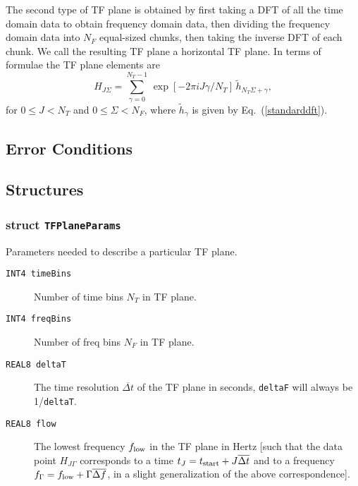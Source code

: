 The second type of TF plane is obtained by first taking a DFT of all the time
domain data to obtain frequency domain data, then dividing the frequency
domain data into $N_F$ equal-sized chunks, then taking the inverse DFT of each
chunk.  We call the resulting TF plane a horizontal TF plane. In terms of
formulae the TF plane elements are \begin{equation} H_{J\Sigma} =
\sum_{\gamma=0}^{N_T-1} \, \exp \left[ -2 \pi i J \gamma / N_T \right] \,
{\tilde h}_{N_T \Sigma + \gamma}, \label{horizontalTFP} \end{equation} for $0
\le J < N_T$ and $0 \le \Sigma < N_F$, where ${\tilde h}_\gamma$ is given by
Eq.\ (\ref{standarddft}).


\subsection*{Error Conditions}


\subsection*{Structures}

\subsubsection*{struct \texttt{TFPlaneParams}}

\noindent Parameters needed to describe a particular TF plane.

\begin{description}
\item[\texttt{INT4 timeBins}] Number of time bins $N_T$ in TF plane. 

\item[\texttt{INT4 freqBins}] Number of freq bins $N_F$ in TF plane.

\item[\texttt{REAL8 deltaT}] The time resolution ${\overline {\Delta t}}$ 
of the TF plane in seconds, \texttt{deltaF} will always be 1/\texttt{deltaT}.

\item[\texttt{REAL8 flow}] The lowest frequency $f_{\rm low}$ in the TF plane
in Hertz [such that the data point $H_{J\Gamma}$ corresponds to a time $t_J =
t_{\rm start} + J {\overline {\Delta t}}$ and to a frequency $f_\Gamma =
f_{\rm low} + \Gamma {\overline {\Delta f}}$, in a slight generalization of
the above correspondence].
\end{description}


